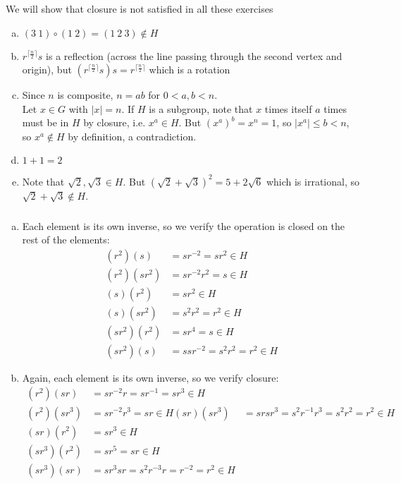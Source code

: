 \documentclass{article}
\newcommand{\inv}[1]{ {#1}^{-1} }
\newcommand{\comp}{ \circ }
\newcommand{\ceil}[1]{\lceil #1 \rceil}
\begin{document}
\subsubsection{}\label{ex1p2}
We will show that closure is not satisfied in all these exercises
\begin{enumerate}[(a)]
\item $(3\ 1)\comp(1\ 2) = (1\ 2\ 3) \notin H$ \label{ex1p2pa}
\newcommand{\lereflect}{r^{\ceil{\frac{n}{2}}}s}
\item $\lereflect$ is a reflection (across the line passing through the second vertex and origin), but $(\lereflect)s = r^{\ceil{\frac{n}{2}}}$ which is a rotation \label{ex1p2pb}
\item Since $n$ is composite, $n=ab$ for $0<a,b<n$.\\
Let $x\in G$ with $|x|=n$. If $H$ is a subgroup, note that $x$ times itself $a$ times must be in $H$ by closure, i.e. $x^a \in H$. But $(x^a)^b = x^n = 1$, so $|x^a| \leq b < n$, so $x^a \notin H$ by definition, a contradiction.
\item $1+1=2$
\item Note that $\sqrt{2},\sqrt{3}\in H$. But $(\sqrt{2}+\sqrt{3})^2  = 5 + 2\sqrt{6}$ which is irrational, so $\sqrt{2}+\sqrt{3} \notin H$.
\end{enumerate}
\subsubsection{}\label{ex1p3}
\begin{enumerate}[(a)]
\item Each element is its own inverse, so we verify the operation is closed on the rest of the elements:
\begin{align*}
(r^2)(s) &= sr^{-2} = sr^2 \in H\\
(r^2)(sr^2) &= sr^{-2}r^2 = s \in H\\
(s)(r^2) &= sr^2 \in H\\
(s)(sr^2) &= s^2r^2 = r^2 \in H\\
(sr^2)(r^2) &= sr^4 = s \in H\\
(sr^2)(s) &= ssr^{-2} =s^2r^2 = r^2 \in H
\end{align*}
\item Again, each element is its own inverse, so we verify closure:
\begin{align*}
(r^2)(sr) &= sr^{-2}r = s\inv{r} = sr^3 \in H\\
(r^2)(sr^3) &= sr^{-2}r^3 = sr \in H
(sr)(sr^3) &= srsr^3 = s^2\inv{r}r^3 = s^2r^2 = r^2 \in H\\
(sr)(r^2) &= sr^3 \in H\\
(sr^3)(r^2) &= sr^5 = sr \in H\\
(sr^3)(sr) &= sr^3sr = s^2r^{-3}r = r^{-2} = r^2 \in H
\end{align*}
\end{enumerate}
\end{document}
